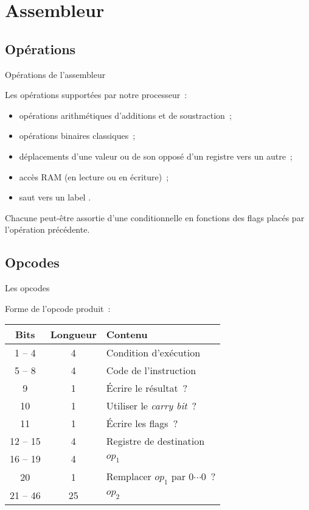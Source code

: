\documentclass[11pt]{beamer}
\begin{document}
\section{Assembleur}

\subsection{Opérations}

\begin{frame}{Opérations de l'assembleur}

Les opérations supportées par notre processeur~:

\begin{itemize}
\item opérations arithmétiques d'additions et de soustraction~;

\item opérations binaires classiques~;

\item déplacements d'une valeur ou de son opposé d'un registre vers un autre~;

\item accès RAM (en lecture ou en  écriture)~;

\item saut vers un label .
\end{itemize}

Chacune peut-être assortie d'une conditionnelle en fonctions des flags placés par l'opération précédente.

\end{frame}

\subsection{Opcodes}

\begin{frame}{Les opcodes}

Forme de l'opcode produit~:

\begin{tabular}{|c|c|l|}
\hline
\textbf{Bits} & \textbf{Longueur} & \textbf{Contenu}\\
\hline
1 -- 4 & 4 & Condition d'exécution \\
5 -- 8 & 4 & Code de l'instruction \\
9 & 1 & Écrire le résultat~? \\
10 & 1 & Utiliser le \textit{carry bit}~?  \\
11 & 1 & Écrire les flags~? \\
12 -- 15 & 4 & Registre de destination \\
16 -- 19 & 4 & $op_1$ \\
20 & 1 & Remplacer $op_1$ par $0\cdots 0$~? \\
21 -- 46 & 25 & $op_2$ \\ \hline
\end{tabular}

\end{frame}
\end{document}
